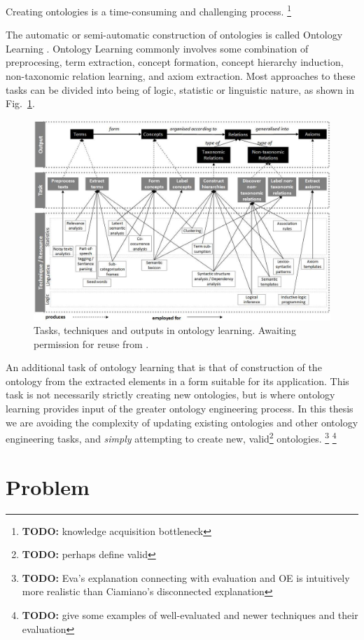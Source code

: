 \documentclass[a4paper]{report}
\newcommand{\todo}[1]{\footnote{{\color{red} {\bf TODO:} #1}}}
\begin{document}
Creating ontologies is a time-consuming and challenging process.
\todo{knowledge acquisition bottleneck}

The automatic or semi-automatic construction of ontologies is called Ontology Learning \cite{Cimiano06}.
Ontology Learning commonly involves some combination of preprocesing, term extraction, concept formation, concept hierarchy induction, non-taxonomic relation learning, and axiom extraction.
Most approaches to these tasks can be divided into being of logic, statistic or linguistic nature, as shown in Fig.~\ref{fig:tasktechout}\cite{Wong11Survey}.
\begin{figure}
  \includegraphics[width=\textwidth]{graphics/output-task-technique-WongLiuBennamoun.png}
  \caption{Tasks, techniques and outputs in ontology learning. Awaiting permission for reuse from \cite{Wong2009PhD}.}
  \label{fig:tasktechout}
\end{figure}
An additional task of ontology learning that is that of construction of the ontology from the extracted elements in a form suitable for its application.
This task is not necessarily strictly creating new ontologies, but is where ontology learning provides input of the greater ontology engineering process.
In this thesis we are avoiding the complexity of updating existing ontologies and other ontology engineering tasks, and \emph{simply} attempting to create new, valid\todo{perhaps define valid} ontologies.
\todo{Eva's explanation connecting with evaluation and OE is intuitively more realistic than Ciamiano's disconnected explanation}
\todo{give some examples of well-evaluated and newer techniques and their evaluation}

\section{Problem}
\end{document}
